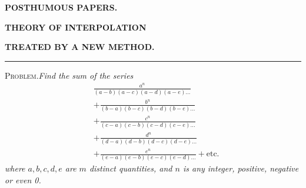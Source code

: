 \clearpage
{}
\begingroup
\renewcommand{\arraystretch}{1.35}
\begin{center}\textbf{POSTHUMOUS PAPERS.}\par\bigskip
\textbf{THEORY OF INTERPOLATION}\par\medskip
\textbf{TREATED BY A NEW METHOD.}\par\medskip
\rule{.15\linewidth}{.4pt}\end{center}
\textsc{Problem.}\quad\textit{Find the sum of the series}
\[
\begin{aligned}
&\frac{a^n}{(a-b)(a-c)(a-d)(a-e)\ldots}\\[5pt]
&+\frac{b^n}{(b-a)(b-c)(b-d)(b-e)\ldots}\\
&+\frac{c^n}{(c-a)(c-b)(c-d)(c-e)\ldots}\\[5pt]
&+\frac{d^n}{(d-a)(d-b)(d-c)(d-e)\ldots}\\
&+\frac{e^n}{(e-a)(e-b)(e-c)(e-d)\ldots}+\text{etc.}
\end{aligned}
\]
\textit{where $a,b,c,d,e$ are $m$ distinct quantities, and $n$ is any integer, positive, negative or even 0.}

